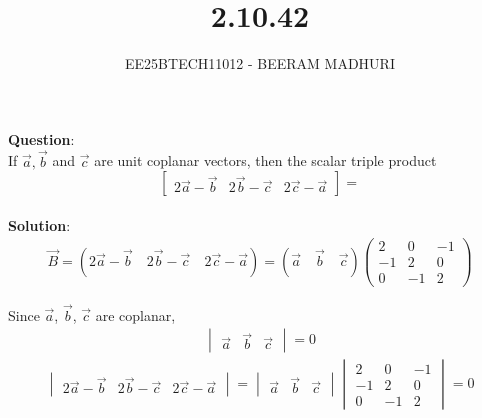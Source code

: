 \documentclass[journal]{IEEEtran}
\begin{document}

\vspace{3cm}

\title{2.10.42}
\author{EE25BTECH11012 - BEERAM MADHURI}
\maketitle
{\let\newpage\relax\maketitle}

\renewcommand{\thefigure}{\theenumi}
\renewcommand{\thetable}{\theenumi}
\setlength{\intextsep}{10pt} %


\renewcommand{\thetable}{\theenumi}

\textbf{Question}:\\
If $\vec{a}, \vec{b}$ and $\vec{c}$ are unit coplanar vectors, then the scalar triple product
\[\begin{bmatrix}2\vec{a} - \vec{b} & 2\vec{b} - \vec{c} & 2\vec{c} - \vec{a}\end{bmatrix} =\]\\
\textbf{Solution}:\\
\begin{align}
\vec{B} = (2\vec{a} - \vec{b} \quad 2\vec{b} - \vec{c} \quad 2\vec{c} - \vec{a}) = (\vec{a} \quad \vec{b} \quad \vec{c})\begin{pmatrix}2 & 0 & -1 \\-1 & 2 & 0 \\0 & -1 & 2\end{pmatrix}
\end{align}

Since $\vec{a}$, $\vec{b}$, $\vec{c}$ are coplanar,
\begin{align}
\begin{vmatrix}\vec{a} & \vec{b} & \vec{c}\end{vmatrix} = 0
\end{align}
\begin{align}
    \begin{vmatrix}2\vec{a} - \vec{b} & 2\vec{b} - \vec{c} & 2\vec{c} - \vec{a}\end{vmatrix} = \begin{vmatrix}\vec{a} & \vec{b} & \vec{c}\end{vmatrix} \begin{vmatrix}2 & 0 & -1 \\-1 & 2 & 0 \\0 & -1 & 2\end{vmatrix} =0
\end{align}
\end{document}
